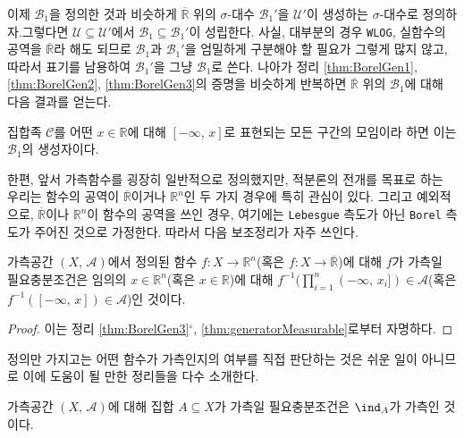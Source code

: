 이제 $\mathcal{B}_1$을 정의한 것과 비슷하게 $\overline{\mathbb{R}}$ 위의 $\sigma$-대수 $\mathcal{B}_1'$을 $\mathcal{U}'$이 생성하는 $\sigma$-대수로 정의하자.\footnotemark 그렇다면 $\mathcal{U}\subseteq\mathcal{U}'$에서 $\mathcal{B}_1\subseteq\mathcal{B}_1'$이 성립한다. 사실, 대부분의 경우 \texttt{WLOG}, 실함수의 공역을 $\overline{\mathbb{R}}$라 해도 되므로 $\mathcal{B}_1$과 $\mathcal{B}_1'$을 엄밀하게 구분해야 할 필요가 그렇게 많지 않고, 따라서 표기를 남용하여 $\mathcal{B}_1'$을 그냥 $\mathcal{B}_1$로 쓴다. 나아가 정리 \ref{thm:BorelGen1}, \ref{thm:BorelGen2}, \ref{thm:BorelGen3}의 증명을 비슷하게 반복하면 $\overline{\mathbb{R}}$ 위의 $\mathcal{B}_1$에 대해 다음 결과를 얻는다.

\vspace{6pt}
 집합족 $\mathcal{C}$를 어떤 $x\in\mathbb{R}$에 대해 $[-\infty,\,x]$로 표현되는 모든 구간의 모임이라 하면 이는 $\mathcal{B}_1$의 생성자이다.

\vspace{6pt}
한편, 앞서 가측함수를 굉장히 일반적으로 정의했지만, 적분론의 전개를 목표로 하는 우리는 함수의 공역이 $\overline{\mathbb{R}}$이거나 $\mathbb{R}^n$인 두 가지 경우에 특히 관심이 있다. 그리고 예외적으로, $\overline{\mathbb{R}}$이나 $\mathbb{R}^n$이 함수의 공역을 쓰인 경우, 여기에는 \texttt{Lebesgue} 측도가 아닌 \texttt{Borel} 측도가 주어진 것으로 가정한다. 따라서 다음 보조정리가 자주 쓰인다.

\begin{corollary}
    가측공간 $(X,\,\mathcal{A})$에서 정의된 함수 $f:X\to\mathbb{R}^n$(혹은 $f:X\to\overline{\mathbb{R}}$)에 대해 $f$가 가측일 필요충분조건은 임의의 $x\in\mathbb{R}^n$(혹은 $x\in\mathbb{R}$)에 대해 $f^{-1}(\prod_{i=1}^n(-\infty,\,x_i])\in\mathcal{A}$(혹은 $f^{-1}([-\infty,\,x])\in\mathcal{A}$)인 것이다.
\end{corollary}

\begin{proof}
    이는 정리 \ref{thm:BorelGen3}$^\circ$, \ref{thm:generatorMeasurable}로부터 자명하다.
\end{proof}

정의만 가지고는 어떤 함수가 가측인지의 여부를 직접 판단하는 것은 쉬운 일이 아니므로 이에 도움이 될 만한 정리들을 다수 소개한다.

\begin{proposition}\label{prop:indicatorMeasurable}
    가측공간 $(X,\,\mathcal{A})$에 대해 집합 $A\subseteq X$가 가측일 필요충분조건은 $\ind_A$가 가측인 것이다.
\end{proposition}

